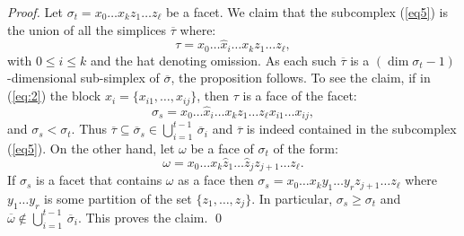 \documentclass[10pt,a4paper]{amsart}
\def\ov{\overline}
\def\ss{\sigma}
\begin{document}
\begin{proof}
Let $\ss_t=x_0\ldots x_k z_1\ldots z_\ell$ be a facet. We claim that
the subcomplex (\ref{eq5}) is the union of all the simplices
$\overline{\tau}$ where:
\begin{equation}
  \label{eq:2}
\tau=x_0\ldots \widehat{x}_i \ldots x_k z_1\ldots z_\ell,
\end{equation}
with $0\leq i\leq k$ and the hat denoting omission. As each such
$\overline{\tau}$ is a $(\dim \sigma_t-1)$-dimensional sub-simplex of
$\overline{\sigma}$, the proposition 
follows. To see the claim, if in (\ref{eq:2}) the block
$x_i=\{x_{i1},\ldots,x_{ij}\}$, then $\tau$ is a face of the facet:
$$
\ss_s=x_0\ldots \widehat{x}_i \ldots x_k z_1\ldots z_\ell x_{i1}\ldots
x_{ij},
$$
and $\ss_s<\ss_t$. Thus $\ov{\tau}\subseteq\ov{\ss}_s\in
  \bigcup_{i=1}^{t-1}\,\overline{\sigma}_i$ and $\ov{\tau}$ is indeed
  contained in the subcomplex (\ref{eq5}).
%
On the other hand, let $\omega$ be a face of $\ss_t$ of the form:
$$
\omega=x_0\ldots x_k \widehat{z}_1\ldots\widehat{z}_jz_{j+1}\ldots z_\ell.
$$
If $\ss_s$ is a facet that contains $\omega$ as a face then
$\ss_s=
x_0\ldots x_k y_1\ldots y_r z_{j+1}\ldots z_\ell$
where $y_1\ldots y_r$ is some partition of the set
$\{z_1,\ldots,z_j\}$. In particular, $\ss_s\geq \ss_t$ and
$\ov{\omega}\not\in \bigcup_{i=1}^{t-1}\,\overline{\sigma}_i$. This
proves the claim. 
  \qed
\end{proof}
\end{document}
